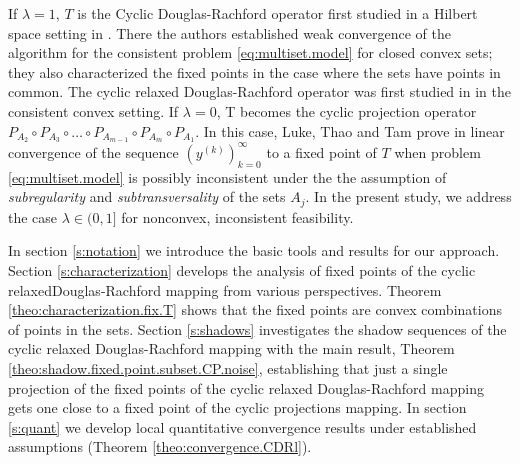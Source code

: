 \documentclass[12pt]{article}
\theoremstyle{definition}
\begin{document}
If $\lambda=1$, $T$ is the Cyclic Douglas-Rachford operator first studied in a Hilbert space setting
in \cite{BorTam14}.
There the authors established weak convergence of the algorithm for the consistent problem
\eqref{eq:multiset.model} for closed convex sets;  they also characterized the fixed points in the case where the sets
have points in common.   The cyclic relaxed Douglas-Rachford operator was first studied in \cite{luke2018relaxed}
in the consistent convex setting.
If $\lambda=0$, T becomes the cyclic projection operator
$P_{A_2}\circ P_{A_3} \circ \dots \circ P_{A_{m-1}} \circ P_{A_m} \circ P_{A_1}$.
In this case, Luke, Thao and Tam prove in \cite[Theorem 3.2]{russell2018quantitative} linear convergence of the
sequence $(y^{(k)})_{k=0}^\infty$ to a fixed point of $T$ when problem \eqref{eq:multiset.model} is possibly
inconsistent under the the assumption of {\em subregularity} and {\em subtransversality} of the sets $A_j$.
In the present study, we address the case $\lambda\in (0,1]$ for nonconvex, inconsistent feasibility.

In section \ref{s:notation} we introduce the basic tools and results for our approach.  Section \ref{s:characterization}
develops the analysis of fixed points of the cyclic relaxedDouglas-Rachford mapping from various perspectives.
Theorem \ref{theo:characterization.fix.T} shows that the fixed points are convex combinations of points in the sets.
Section \ref{s:shadows} investigates the shadow sequences of the cyclic relaxed Douglas-Rachford mapping with the main result,
Theorem \ref{theo:shadow.fixed.point.subset.CP.noise}, establishing that just a single projection of the fixed points of the
cyclic relaxed Douglas-Rachford mapping gets one close to a fixed point of the cyclic projections mapping.  In section \ref{s:quant}
we develop local quantitative convergence results under established assumptions (Theorem \ref{theo:convergence.CDRl}).
\end{document}
